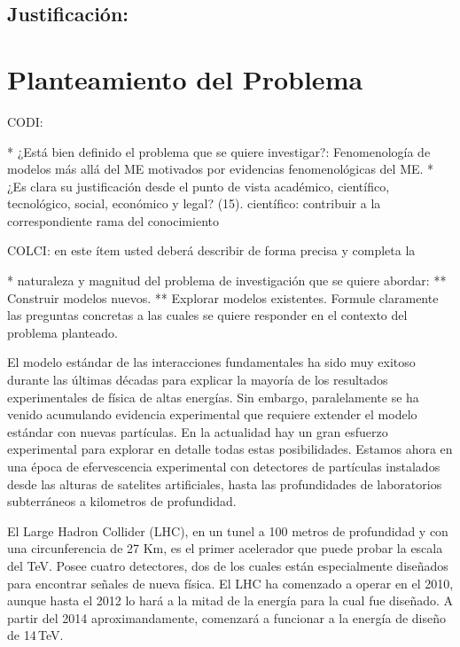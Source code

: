 \subsection{Justificación:                                 }
\section{Planteamiento del Problema }
\begin{instrucciones}
  CODI: 

  * ¿Está bien definido el problema que se quiere investigar?:
  Fenomenología de modelos más allá del ME motivados por evidencias
  fenomenológicas del ME.  
  * ¿Es clara su justificación desde el punto de vista académico,
  científico, tecnológico, social, económico y legal? (15).
  científico: contribuir a la correspondiente rama del conocimiento

  COLCI: en este ítem usted deberá describir de forma precisa y completa la
  
  * naturaleza y magnitud del problema de investigación que se quiere
  abordar:
  ** Construir modelos nuevos.
  ** Explorar modelos existentes.
  Formule claramente las preguntas concretas a las cuales se
  quiere responder en el contexto del problema planteado.
\end{instrucciones}
El modelo estándar de las interacciones fundamentales ha sido muy
exitoso durante las últimas décadas para explicar la mayoría de los
resultados experimentales de física de altas energías. Sin embargo,
paralelamente se ha venido acumulando evidencia experimental que
requiere extender el modelo estándar con nuevas partículas. En la
actualidad hay un gran esfuerzo experimental para explorar en detalle
todas estas posibilidades. Estamos ahora en una época de efervescencia
experimental con detectores de partículas instalados desde las alturas
de satelites artificiales, hasta las profundidades de laboratorios
subterráneos a kilometros de profundidad.

El Large Hadron Collider (LHC), en un tunel a 100 metros de profundidad y
con una circunferencia de 27 Km, es el primer acelerador
que puede probar la escala del TeV.  Posee cuatro
detectores, dos de los cuales están especialmente diseñados para
encontrar señales de nueva física. El LHC  ha comenzado a
operar en el 2010, aunque hasta el 2012 lo hará a la mitad de la
energía para la cual fue diseñado. A partir del 2014 aproximandamente, comenzará a funcionar a la energía de diseño de 14\,TeV.

